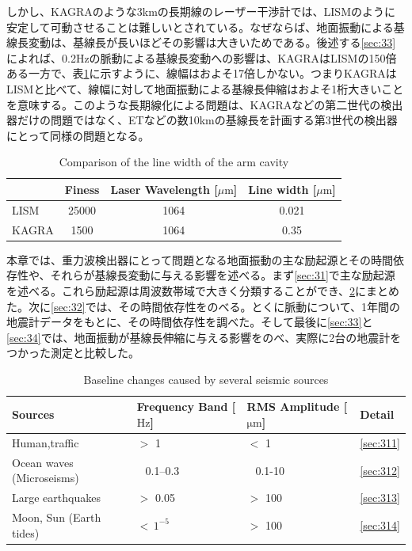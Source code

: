 しかし、KAGRAのような3kmの長期線のレーザー干渉計では、LISMのように安定して可動させることは難しいとされている。なぜならば、地面振動による基線長変動は、基線長が長いほどその影響は大きいためである。後述する\cref{sec:33}によれば、0.2Hzの脈動による基線長変動への影響は、KAGRAはLISMの150倍ある一方で、表\ref{tb:301}に示すように、線幅はおよそ17倍しかない。つまりKAGRAはLISMと比べて、線幅に対して地面振動による基線長伸縮はおよそ1桁大きいことを意味する。このような長期線化による問題は、KAGRAなどの第二世代の検出器だけの問題ではなく、ETなどの数10kmの基線長を計画する第3世代の検出器にとって同様の問題となる。

\begin{table}[H]
  \centering
  \caption{Comparison of the line width of the arm cavity}
  \begin{tabular}{lccc}
    \hline
     & Finess   & Laser Wavelength [$\mu\mathrm{m}$] & Line width [$\mu\mathrm{m}$] \\
    \hline
    LISM            & 25000  & 1064  & 0.021\\
    KAGRA           & 1500   & 1064  & 0.35\\
    \hline
  \end{tabular}\label{tb:301}
\end{table}

本章では、重力波検出器にとって問題となる地面振動の主な励起源とその時間依存性や、それらが基線長変動に与える影響を述べる。まず\cref{sec:31}で主な励起源を述べる。これら励起源は周波数帯域で大きく分類することができ、\ref{tb:310}にまとめた。次に\cref{sec:32}では、その時間依存性をのべる。とくに脈動について、1年間の地震計データをもとに、その時間依存性を調べた。そして最後に\cref{sec:33}と\cref{sec:34}では、地面振動が基線長伸縮に与える影響をのべ、実際に2台の地震計をつかった測定と比較した。

\begin{table}[H]
  \centering
  \caption{Baseline changes caused by several seismic sources}
  \begin{tabular}{llll}
    \hline
    Sources & Frequency Band [$\mathrm{Hz}$]  & RMS Amplitude [$\mathrm{\mu m}$] & Detail\\
    \hline
    Human,traffic            & $>$ 1             & $<$ 1         & \cref{sec:311}\\
    Ocean waves (Microseisms)& $\ \ $ 0.1--0.3   & $\ \ $ 0.1-10 & \cref{sec:312}\\
    Large earthquakes        & $>$ 0.05          & $>$ 100       & \cref{sec:313}\\    
    Moon, Sun (Earth tides)  & $<\, 1^{-5}$      & $>$ 100       & \cref{sec:314}\\
    \hline
  \end{tabular}\label{tb:310}
\end{table}


